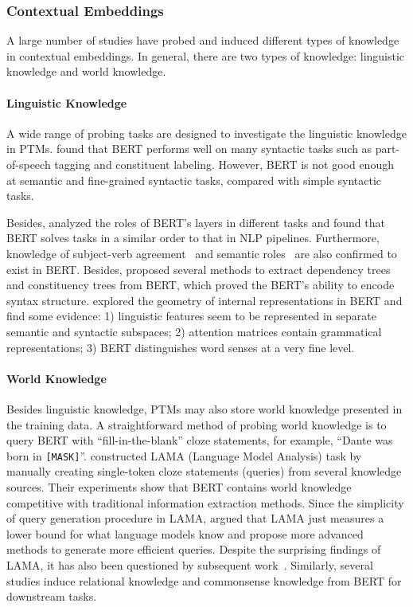 \documentclass[fleqn]{SCYE-arxiv}
\begin{document}
\begin{multicols}{2}
\subsubsection{Contextual Embeddings}
A large number of studies have probed and induced different types of knowledge in contextual embeddings. In general, there are two types of knowledge: linguistic knowledge and world knowledge.

\paragraph{Linguistic Knowledge}

A wide range of probing tasks are designed to investigate the linguistic knowledge in PTMs. \citet{tenney2019what,liu2019ling} found that BERT performs well on many syntactic tasks such as part-of-speech tagging and constituent labeling. However, BERT is not good enough at semantic and fine-grained syntactic tasks, compared with simple syntactic tasks.

Besides, \citet{DBLP:conf/acl/TenneyDP19} analyzed the roles of BERT's layers in different tasks and found that BERT solves tasks in a similar order to that in NLP pipelines.
Furthermore, knowledge of subject-verb agreement~\cite{goldberg2019assessing} and semantic roles~\cite{ettinger2020what} are also confirmed to exist in BERT. Besides, \citet{hewitt2019structural,jawahar2019what,kim2020are} proposed several methods to extract dependency trees and constituency trees from BERT, which proved the BERT's ability to encode syntax structure.
\citet{reif2019visualizing} explored the geometry of internal representations in BERT and find some evidence: 1)  linguistic features seem to be represented in separate semantic and
syntactic subspaces; 2) attention matrices contain grammatical representations; 3) BERT distinguishes word senses at a very fine level.

\paragraph{World Knowledge}

Besides linguistic knowledge, PTMs may also store world knowledge presented in the training data. A straightforward method of probing world knowledge is to query BERT with ``fill-in-the-blank'' cloze statements, for example, ``Dante was born in \texttt{[MASK]}''.  \citet{petroni2019language} constructed LAMA (Language Model Analysis) task by manually creating single-token cloze statements (queries) from several knowledge sources. Their experiments show that BERT contains world knowledge competitive with traditional information extraction methods. Since the simplicity of query generation procedure in LAMA, \citet{jiang2019how} argued that LAMA just measures a lower bound for what language models know and propose more advanced methods to generate more efficient queries. Despite the surprising findings of LAMA, it has also been questioned by subsequent work~\cite{porner2019bert,kassner2019negated}. Similarly, several studies induce relational knowledge \cite{bouraoui2019inducing} and commonsense knowledge \cite{davison2019commonsense} from BERT for downstream tasks.



\end{multicols}
\end{document}
